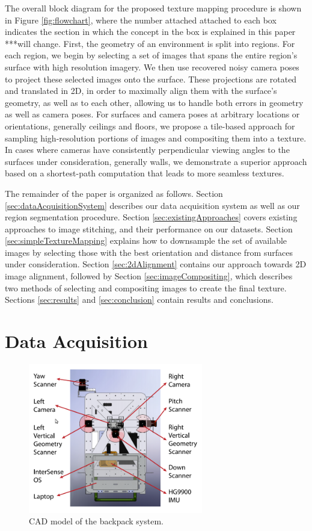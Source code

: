 \documentclass[]{spie}  %
\begin{document}
The overall block diagram for the proposed texture mapping procedure
is shown in Figure \ref{fig:flowchart}, where the number attached
attached to each box indicates the section in which the concept in the
box is explained in this paper ***will change. First, the geometry of
an environment is split into regions. For each region, we begin by
selecting a set of images that spans the entire region's surface with
high resolution imagery. We then use recovered noisy camera poses to project
these selected images onto the surface. These projections are rotated
and translated in 2D, in order to maximally align them with the
surface's geometry, as well as to each other, allowing us to handle
both errors in geometry as well as camera poses. For surfaces and
camera poses at arbitrary locations or orientations, generally
ceilings and floors, we propose a tile-based approach for sampling
high-resolution portions of images and compositing them into a
texture. In cases where cameras have consistently perpendicular
viewing angles to the surfaces under consideration, generally walls,
we demonstrate a superior approach based on a shortest-path
computation that leads to more seamless textures.

The remainder of the paper is organized as follows. Section
\ref{sec:dataAcquisitionSystem} describes our data acquisition system
as well as our region segmentation procedure. Section
\ref{sec:existingApproaches} covers existing approaches to image
stitching, and their performance on our datasets. Section
\ref{sec:simpleTextureMapping} explains how to downsample the set of
available images by selecting those with the best orientation and
distance from surfaces under consideration. Section
\ref{sec:2dAlignment} contains our approach towards 2D image
alignment, followed by Section \ref{sec:imageCompositing}, which
describes two methods of selecting and compositing images to create
the final texture. Sections \ref{sec:results} and \ref{sec:conclusion}
contain results and conclusions.

\section{Data Acquisition}
\label{sec:dataAcquisition}

\begin{figure}
  \centering
  \includegraphics[width=3in]{backpackCAD.png}
  \caption{CAD model of the backpack system.}
  \label{fig:backpack}
\end{figure}
\end{document}
